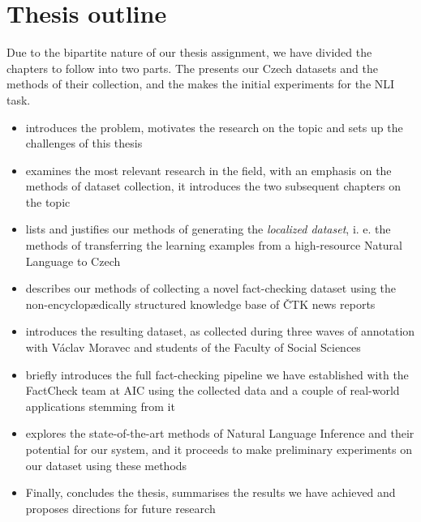 \section{Thesis outline}
Due to the bipartite nature of our thesis assignment, we have divided the chapters to follow into two parts. The {} presents our Czech datasets and the methods of their collection, and the {} makes the initial experiments for the NLI task.
\begin{itemize}
\item {} introduces the problem, motivates the research on the topic and sets up the challenges of this thesis 

\item {} examines the most relevant research in the field, with an emphasis on the methods of dataset collection, it introduces the two subsequent chapters on the topic

\item {} lists and justifies our methods of generating the \textit{localized dataset}, i. e. the methods of transferring the learning examples from a high-resource Natural Language to Czech

\item {} describes our methods of collecting a novel fact-checking dataset using the non-encyclop\ae dically structured knowledge base of \textsf{ČTK} news reports

\item {} introduces the resulting dataset, as collected during three waves of annotation with Václav Moravec and students of the \textsf{Faculty of Social Sciences}
\item  {} briefly introduces the full fact-checking pipeline we have established with the \textsf{FactCheck} team at \textsf{AIC} using the collected data and a couple of real-world applications stemming from it
\item {} explores the state-of-the-art methods of Natural Language Inference and their potential for our system, and it proceeds to make preliminary experiments on our dataset using these methods
\item Finally, {} concludes the thesis, summarises the results we have achieved and proposes directions for future research

\end{itemize}

